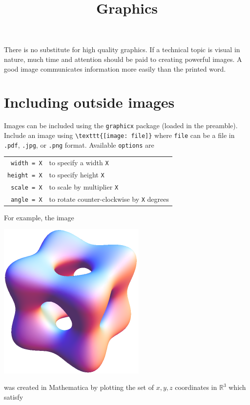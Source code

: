 \documentclass{article}
\title{Graphics}
\date{}
\begin{document}
\maketitle

There is no substitute for high quality graphics.  If a technical
topic is visual in nature, much time and attention should be paid
to creating powerful images.  A good image communicates
information more easily than the printed word.

\section{Including outside images}

Images can be included using the \verb~graphicx~ package (loaded
in the preamble).  Include an image using
\verb~\texttt{[image: file]}~ where \verb~file~ can be a
file in \verb~.pdf~, \verb~.jpg~, or \verb~.png~ format.
Available \verb~options~ are
\begin{center}
  \begin{tabular}{r l}
    \verb~width = X~  & to specify a width \verb~X~     \\
    \verb~height = X~ & to specify height \verb~X~      \\
    \verb~scale = X~  & to scale by multiplier \verb~X~ \\
    \verb~angle = X~  & to rotate counter-clockwise by \verb~X~ degrees
  \end{tabular}
\end{center}
For example, the image
\begin{center}
  \includegraphics[scale = 1.25]{351Week6HolyCube}
\end{center}
was created in Mathematica by plotting the set of $x,y,z$
coordinates in $\mathbb{R}^3$ which satisfy
\end{document}
